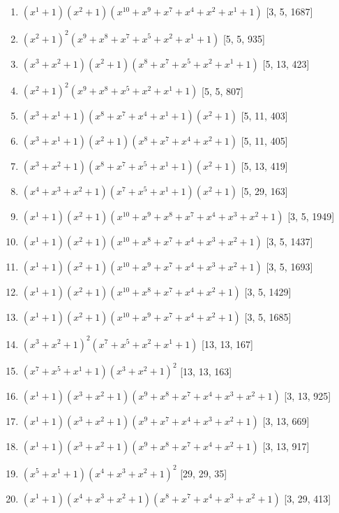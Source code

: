 \documentclass[10pt,twocolumn]{article}
\begin{document}
\begin{enumerate}
\item $(x^{1} + 1)(x^{2} + 1)(x^{10} + x^{9} + x^{7} + x^{4} + x^{2} + x^{1} + 1)$  [3, 5, 1687]
\item $(x^{2} + 1)^{2}(x^{9} + x^{8} + x^{7} + x^{5} + x^{2} + x^{1} + 1)$  [5, 5, 935]
\item $(x^{3} + x^{2} + 1)(x^{2} + 1)(x^{8} + x^{7} + x^{5} + x^{2} + x^{1} + 1)$  [5, 13, 423]
\item $(x^{2} + 1)^{2}(x^{9} + x^{8} + x^{5} + x^{2} + x^{1} + 1)$  [5, 5, 807]
\item $(x^{3} + x^{1} + 1)(x^{8} + x^{7} + x^{4} + x^{1} + 1)(x^{2} + 1)$  [5, 11, 403]
\item $(x^{3} + x^{1} + 1)(x^{2} + 1)(x^{8} + x^{7} + x^{4} + x^{2} + 1)$  [5, 11, 405]
\item $(x^{3} + x^{2} + 1)(x^{8} + x^{7} + x^{5} + x^{1} + 1)(x^{2} + 1)$  [5, 13, 419]
\item $(x^{4} + x^{3} + x^{2} + 1)(x^{7} + x^{5} + x^{1} + 1)(x^{2} + 1)$  [5, 29, 163]
\item $(x^{1} + 1)(x^{2} + 1)(x^{10} + x^{9} + x^{8} + x^{7} + x^{4} + x^{3} + x^{2} + 1)$  [3, 5, 1949]
\item $(x^{1} + 1)(x^{2} + 1)(x^{10} + x^{8} + x^{7} + x^{4} + x^{3} + x^{2} + 1)$  [3, 5, 1437]
\item $(x^{1} + 1)(x^{2} + 1)(x^{10} + x^{9} + x^{7} + x^{4} + x^{3} + x^{2} + 1)$  [3, 5, 1693]
\item $(x^{1} + 1)(x^{2} + 1)(x^{10} + x^{8} + x^{7} + x^{4} + x^{2} + 1)$  [3, 5, 1429]
\item $(x^{1} + 1)(x^{2} + 1)(x^{10} + x^{9} + x^{7} + x^{4} + x^{2} + 1)$  [3, 5, 1685]
\item $(x^{3} + x^{2} + 1)^{2}(x^{7} + x^{5} + x^{2} + x^{1} + 1)$  [13, 13, 167]
\item $(x^{7} + x^{5} + x^{1} + 1)(x^{3} + x^{2} + 1)^{2}$  [13, 13, 163]
\item $(x^{1} + 1)(x^{3} + x^{2} + 1)(x^{9} + x^{8} + x^{7} + x^{4} + x^{3} + x^{2} + 1)$  [3, 13, 925]
\item $(x^{1} + 1)(x^{3} + x^{2} + 1)(x^{9} + x^{7} + x^{4} + x^{3} + x^{2} + 1)$  [3, 13, 669]
\item $(x^{1} + 1)(x^{3} + x^{2} + 1)(x^{9} + x^{8} + x^{7} + x^{4} + x^{2} + 1)$  [3, 13, 917]
\item $(x^{5} + x^{1} + 1)(x^{4} + x^{3} + x^{2} + 1)^{2}$  [29, 29, 35]
\item $(x^{1} + 1)(x^{4} + x^{3} + x^{2} + 1)(x^{8} + x^{7} + x^{4} + x^{3} + x^{2} + 1)$  [3, 29, 413]

\end{enumerate}
\end{document}
